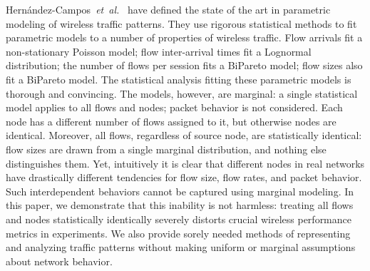 \documentclass[twocolumn,final]{svjour3}
\newcommand{\caps}[1]{{\smaller{#1}}}
\newcommand{\FHC}{Hern\'andez-Campos~\textit{et~al.}}
\begin{document}
\FHC~\cite{Hernandez06:spatio-temporal-modeling} have defined the state of the art in parametric modeling of wireless traffic patterns.
They use rigorous statistical methods to fit parametric models to a number of properties of wireless traffic.
Flow arrivals fit a non-stationary Poisson model;
flow inter-arrival times fit a Lognormal distribution;
the number of flows per session fits a BiPareto model;
flow sizes also fit a BiPareto model.
The statistical analysis fitting these parametric models is thorough and convincing.
The models, however, are marginal:
a single statistical model applies to all flows and nodes; packet behavior is not considered.
Each node has a different number of flows assigned to it, but otherwise nodes are identical. 
Moreover, all flows, regardless of source node, are statistically identical:
flow sizes are drawn from a single marginal distribution, and nothing else distinguishes them.
Yet, intuitively it is clear that different nodes in real networks have drastically different tendencies for flow size, flow rates, and packet behavior.
Such interdependent behaviors cannot be captured using marginal modeling.
In this paper, we demonstrate that this inability is not harmless:
treating all flows and nodes statistically identically severely distorts crucial wireless performance metrics in experiments.
We also provide sorely needed methods of representing and analyzing traffic patterns without making uniform or marginal assumptions about network behavior.


\end{document}

